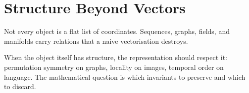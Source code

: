 \chapter{Structure Beyond Vectors}
\label{ch:beyond-vectors}

Not every object is a flat list of coordinates. Sequences, graphs, fields, and manifolds carry relations that a naive vectorisation destroys.

When the object itself has structure, the representation should respect it: permutation symmetry on graphs, locality on images, temporal order on language. The mathematical question is which invariants to preserve and which to discard.
